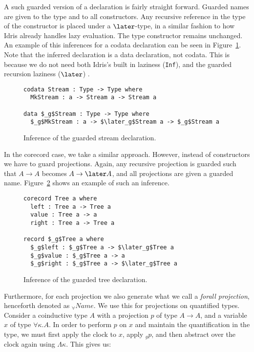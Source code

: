 A such guarded version of a declaration is fairly straight forward. Guarded
names are given to the type and to all constructors. Any recursive reference in
the type of the constructor is placed under a $\later$-type, in a similar
fashion to how Idris already handles lazy evaluation. The type constructor
remains unchanged. An example of this inferences for a codata declaration can be
seen in Figure~\ref{fig:guarded_stream_inf}. Note that the inferred declaration
is a data declaration, not codata. This is because we do not need both Idris's
built in laziness (\texttt{Inf}), and the guarded recursion laziness ($\later$)
.

\begin{figure}[h]
\begin{lstlisting}[mathescape]
codata Stream : Type -> Type where
  MkStream : a -> Stream a -> Stream a

data $_g$Stream : Type -> Type where
  $_g$MkStream : a -> $\later_g$Stream a -> $_g$Stream a
\end{lstlisting}
  \caption{Inference of the guarded stream declaration.}
  \label{fig:guarded_stream_inf}
\end{figure}

In the corecord case, we take a similar approach. However, instead of
constructors we have to guard projections. Again, any recursive projection is
guarded such that $A \rightarrow A$ becomes $A \rightarrow \later A$, and all
projections are given a guarded name. Figure~\ref{fig:guarded_tree_inf} shows an
example of such an inference.

\begin{figure}[h]
\begin{lstlisting}[mathescape]
corecord Tree a where
  left : Tree a -> Tree a
  value : Tree a -> a
  right : Tree a -> Tree a

record $_g$Tree a where
  $_g$left : $_g$Tree a -> $\later_g$Tree a
  $_g$value : $_g$Tree a -> a
  $_g$right : $_g$Tree a -> $\later_g$Tree a
\end{lstlisting}
  \caption{Inference of the guarded tree declaration.}
  \label{fig:guarded_tree_inf}
\end{figure}

Furthermore, for each projection we also generate what we call a \emph{forall
  projection}, henceforth denoted as $_\forall Name$. We use this for
projections on quantified types. Consider a coinductive type $A$ with a
projection $p$ of type $A \rightarrow A$, and a variable $x$ of type $\forall
\kappa.A$. In order to perform $p$ on $x$ and maintain the quantification in the
type, we must first apply the clock to $x$, apply $_gp$, and then abstract over the
clock again using $\Lambda \kappa$. This gives us:

